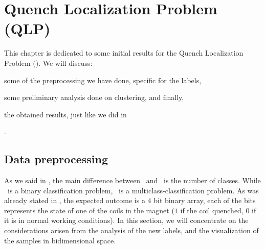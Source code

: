 \chapter{Quench Localization Problem (QLP)}
\label{chp:qlp}
This chapter is dedicated to some initial results for the Quench Localization Problem (\qlp). We will discuss:
\begin{inparaenum}[(i)]
	\item some of the preprocessing we have done, specific for the labels,
	\item some preliminary analysis done on clustering, and finally,
	\item the obtained results, just like we did in 
\end{inparaenum}.
\section{Data preprocessing}
\label{sec:qlp-preprocessing}
As we said in , the main difference between \qlp\ and \qrp\ is the number of
classes. While \qrp\ is a binary classification problem, \qlp\ is a multiclass-classification
problem. As was already stated in , the expected outcome is a $4$ bit binary
array, each of the bits represents the state of one of the coils in the magnet ($1$ if the coil
quenched, $0$ if it is in normal working conditions). In this section, we will concentrate on the
considerations arisen from the analysis of the new labels, and the visualization of the samples in
bidimensional space.

